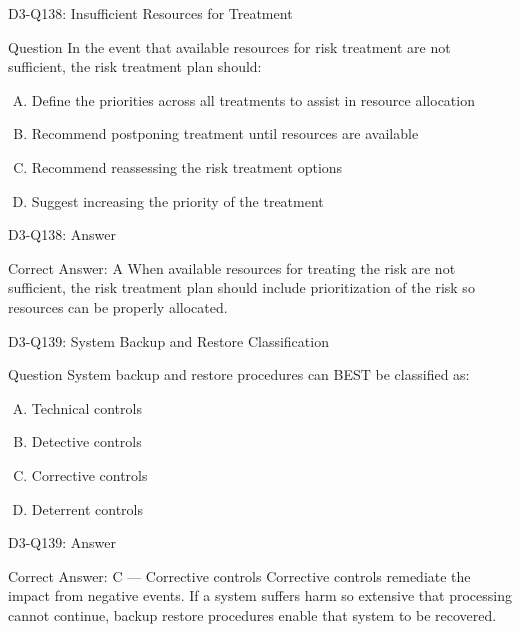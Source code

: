 \documentclass{beamer}
\begin{document}
	\begin{frame}{D3-Q138: Insufficient Resources for Treatment}
		\begin{block}{Question}
			In the event that available resources for risk treatment are not sufficient, the risk treatment plan should:
		\end{block}
		\begin{enumerate}[(A)]
			\item Define the priorities across all treatments to assist in resource allocation
			\item Recommend postponing treatment until resources are available
			\item Recommend reassessing the risk treatment options
			\item Suggest increasing the priority of the treatment
		\end{enumerate}
	\end{frame}
	\begin{frame}{D3-Q138: Answer}
		\begin{block}{Correct Answer: A}
			When available resources for treating the risk are not sufficient, the risk treatment plan should include prioritization of the risk so resources can be properly allocated.
		\end{block}
	\end{frame}
	
	\begin{frame}{D3-Q139: System Backup and Restore Classification}
		\begin{block}{Question}
			System backup and restore procedures can BEST be classified as:
		\end{block}
		\begin{enumerate}[(A)]
			\item Technical controls
			\item Detective controls
			\item Corrective controls
			\item Deterrent controls
		\end{enumerate}
	\end{frame}
	\begin{frame}{D3-Q139: Answer}
		\begin{block}{Correct Answer: C --- Corrective controls}
			Corrective controls remediate the impact from negative events. If a system suffers harm so extensive that processing cannot continue, backup restore procedures enable that system to be recovered.
		\end{block}
	\end{frame}
	
\end{document}
